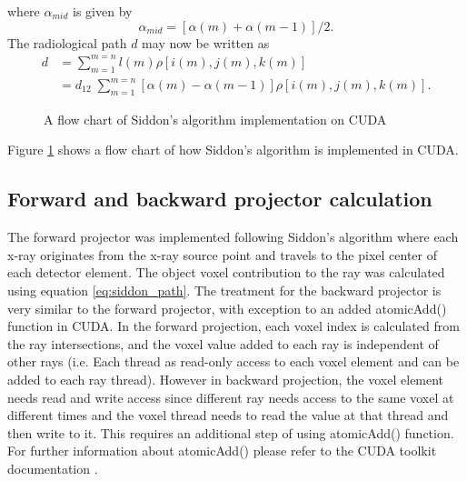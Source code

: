 where $\alpha_{mid}$ is given by 
\begin{equation}
\alpha_{mid} = \left[ \alpha(m) + \alpha(m-1) \right] /2.
\label{eq:siddon_alphamid}
\end{equation}
The radiological path $d$ may now be written as 
\begin{equation}
\begin{aligned}
d &= \sum\limits_{m = 1}^{m = n} l(m) \rho\left[ i(m), j(m), k(m) \right] \\
  &= d_{12} \; \sum\limits_{m = 1}^{m = n} \left[ \alpha(m) - \alpha(m-1) \right] \rho \left[ i(m), j(m), k(m) \right].
\end{aligned}
\label{eq:siddon_path}
\end{equation}

\begin{figure}
\centering
{}
\caption{A flow chart of Siddon's algorithm implementation on CUDA}
\label{fig:siddon_algorithm_flow_chart}
\end{figure}

Figure \ref{fig:siddon_algorithm_flow_chart} shows a flow chart of how Siddon's algorithm is implemented in CUDA.

\subsection{Forward and backward projector calculation}

The forward projector was implemented following Siddon's algorithm where each x-ray originates from the x-ray source point and travels to the pixel center of each detector element.  The object voxel contribution to the ray was calculated using equation \ref{eq:siddon_path}.  The treatment for the backward projector is very similar to the forward projector, with exception to an added atomicAdd() function in CUDA.  In the forward projection, each voxel index is calculated from the ray intersections, and the voxel value added to each ray is independent of other rays (i.e. Each thread as read-only access to each voxel element and can be added to each ray thread).  However in backward projection, the voxel element needs read and write access since different ray needs access to the same voxel at different times and the voxel thread needs to read the value at that thread and then write to it.  This requires an additional step of using atomicAdd() function.  For further information about atomicAdd() please refer to the CUDA toolkit documentation \cite{Cudatoolkit}.  

